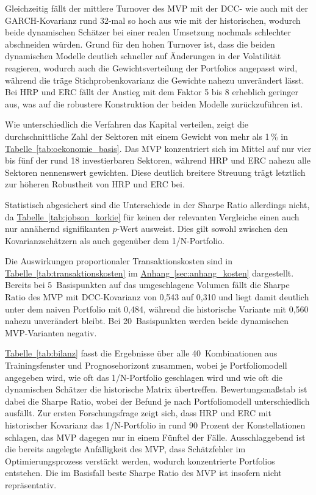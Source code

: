 \documentclass[12pt,a4paper]{article}
\begin{document}
Gleichzeitig fällt der mittlere Turnover des MVP mit der DCC- wie auch mit der GARCH-Kovarianz rund 32-mal so hoch aus wie mit der historischen, wodurch beide dynamischen Schätzer bei einer realen Umsetzung nochmals schlechter abschneiden würden.
Grund für den hohen Turnover ist, dass die beiden dynamischen Modelle deutlich schneller auf Änderungen in der Volatilität reagieren, wodurch auch die Gewichtsverteilung der Portfolios angepasst wird, während die träge Stichprobenkovarianz die Gewichte nahezu unverändert lässt.
Bei HRP und ERC fällt der Anstieg mit dem Faktor 5 bis 8 erheblich geringer aus, was auf die robustere Konstruktion der beiden Modelle zurückzuführen ist.

Wie unterschiedlich die Verfahren das Kapital verteilen, zeigt die durchschnittliche Zahl der Sektoren mit einem Gewicht von mehr als 1\,\% in \hyperref[tab:oekonomie_basis]{Tabelle~\ref*{tab:oekonomie_basis}}. Das MVP konzentriert sich im Mittel auf nur vier bis fünf der rund 18 investierbaren Sektoren, während HRP und ERC nahezu alle Sektoren nennenswert gewichten. Diese deutlich breitere Streuung trägt letztlich zur höheren Robustheit von HRP und ERC bei.

Statistisch abgesichert sind die Unterschiede in der Sharpe Ratio allerdings nicht, da \hyperref[tab:jobson_korkie]{Tabelle~\ref*{tab:jobson_korkie}} für keinen der relevanten Vergleiche einen auch nur annähernd signifikanten $p$-Wert ausweist.
Dies gilt sowohl zwischen den Kovarianzschätzern als auch gegenüber dem 1/N-Portfolio.



Die Auswirkungen proportionaler Transaktionskosten sind in \hyperref[tab:transaktionskosten]{Tabelle~\ref*{tab:transaktionskosten}} im \hyperref[sec:anhang_kosten]{Anhang~\ref*{sec:anhang_kosten}} dargestellt.
Bereits bei 5~Basispunkten auf das umgeschlagene Volumen fällt die Sharpe Ratio des MVP mit DCC-Kovarianz von 0,543 auf 0,310 und liegt damit deutlich unter dem naiven Portfolio mit 0,484, während die historische Variante mit 0,560 nahezu unverändert bleibt.
Bei 20~Basispunkten werden beide dynamischen MVP-Varianten negativ.

\hyperref[tab:bilanz]{Tabelle~\ref*{tab:bilanz}} fasst die Ergebnisse über alle 40~Kombinationen aus Trainingsfenster und Prognosehorizont zusammen, wobei je Portfoliomodell angegeben wird, wie oft das 1/N-Portfolio geschlagen wird und wie oft die dynamischen Schätzer die historische Matrix übertreffen.
Bewertungsmaßstab ist dabei die Sharpe Ratio, wobei der Befund je nach Portfoliomodell unterschiedlich ausfällt.
Zur ersten Forschungsfrage zeigt sich, dass HRP und ERC mit historischer Kovarianz das 1/N-Portfolio in rund 90 Prozent der Konstellationen schlagen, das MVP dagegen nur in einem Fünftel der Fälle.
Ausschlaggebend ist die bereits angelegte Anfälligkeit des MVP, dass Schätzfehler im Optimierungsprozess verstärkt werden, wodurch konzentrierte Portfolios entstehen.
Die im Basisfall beste Sharpe Ratio des MVP ist insofern nicht repräsentativ.
\end{document}

